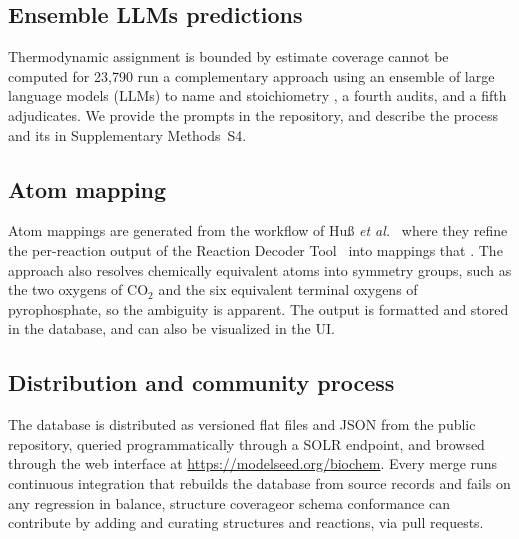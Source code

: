\documentclass[unnumsec,webpdf,modern,large]{oup-authoring-template}
\newcommand{\modelseedurl}{\url{https://modelseed.org/biochem}}
\providecommand{\DIFadd}[1]{{\protect\color{red}{#1}}} %
\providecommand{\DIFaddbegin}{} %
\providecommand{\DIFaddend}{} %
\begin{document}
\subsection{Ensemble LLMs predictions}\label{sec:llm-grading}
Thermodynamic assignment is bounded by estimate coverage \DIFaddbegin \DIFadd{, which means that energies and therefore directions }\DIFaddend cannot be computed for  23,790  \DIFaddbegin \DIFadd{structurally incomplete reactions.
We therefore }\DIFaddend run a complementary approach using an ensemble  \DIFaddbegin \DIFadd{or "council" }\DIFaddend of large language models (LLMs) to  \DIFaddbegin \DIFadd{estimate directionality from only reaction }\DIFaddend name and stoichiometry \DIFaddbegin \DIFadd{, where three LLM agents independently predict a direction}\DIFaddend , a fourth audits, and a fifth adjudicates.
We provide the prompts in the repository, and describe the process and its  \DIFaddbegin \DIFadd{limitations }\DIFaddend in Supplementary Methods~S4.
\subsection{Atom mapping}\label{sec:methods-mapping}

Atom mappings are generated from the workflow of Hu{\ss} \textit{et al.}~\cite{huss2022} where they refine the per-reaction output of the Reaction Decoder Tool~\cite{rahman2016} into mappings that  \DIFaddbegin \DIFadd{are comprehensive enough for reconstructing a metabolic model}\DIFaddend .
The approach also resolves chemically equivalent atoms into symmetry groups, such as the two oxygens of CO$_2$ and the six equivalent terminal oxygens of pyrophosphate, so the ambiguity is apparent.
The output is formatted and stored in the database, and can also be visualized in the UI.

\subsection{Distribution and community process}\label{sec:methods-distribution}

The database is distributed as versioned flat files and JSON from the public repository, queried programmatically through a SOLR endpoint, and browsed through the web interface at \modelseedurl.
Every merge runs continuous integration that rebuilds the database from source records and fails on any regression in balance, structure coverage\DIFaddbegin \DIFadd{, }\DIFaddend or schema conformance  \DIFaddbegin \DIFadd{to prevent curation changes from breaking the database.
Anyone }\DIFaddend can contribute by adding and curating structures and reactions,  \DIFaddbegin \DIFadd{following guidance in the repository }\DIFaddend via pull requests.
\end{document}
